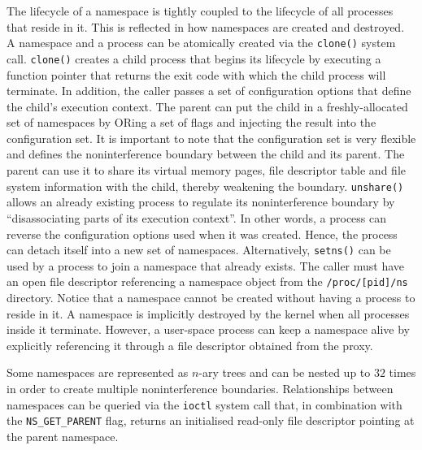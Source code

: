 The lifecycle of a namespace is tightly coupled to the lifecycle of all processes that reside in it. 
This is reflected in how namespaces are created and destroyed. 
A namespace and a process can be atomically created via the \verb|clone()| system call.
\verb|clone()| creates a child process that begins its lifecycle by executing 
a function pointer that returns the exit code with which the child process will terminate.
In addition, the caller passes a set of configuration options that define the child's execution context.
The parent can put the child in a freshly-allocated set of namespaces by ORing a set of flags 
and injecting the result into the configuration set. It is important to note that the 
configuration set is very flexible and defines the noninterference boundary between the child and its parent. 
The parent can use it to share its virtual memory pages, file descriptor table and file system information 
with the child, thereby weakening the boundary. 
\verb|unshare()| allows an already existing process to regulate its noninterference boundary by
\enquote{disassociating parts of its execution context}. In other words, a process can 
reverse the configuration options used when it was created.
Hence, the process can detach itself into a new set of namespaces.
Alternatively, \verb|setns()| can be used by a process to join a namespace that already exists. The caller 
must have an open file descriptor referencing a namespace object from the \verb|/proc/[pid]/ns| directory. 
Notice that a namespace cannot be created without having a process to reside in it. 
A namespace is implicitly 
destroyed by the kernel when all processes inside it terminate. 
However, a user-space process can keep a namespace alive by explicitly referencing it through a 
file descriptor obtained from the proxy.

Some namespaces are represented as $n$-ary trees and can be nested up to $32$ times in order to create multiple 
noninterference boundaries. Relationships between namespaces can be queried via the \verb|ioctl|
system call that, in combination with the \verb|NS_GET_PARENT| flag, returns an initialised read-only file descriptor pointing at 
the parent namespace. 

